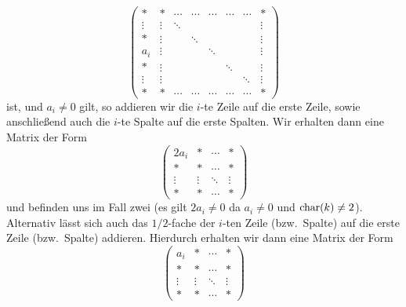 \begin{enumerate}
\[\begin{pmatrix}
        *       & *       & \cdots  & \cdots  & \cdots  & \cdots  & \cdots  & *       \\
        \vdots  & \vdots  & \ddots  &         &         &         &         & \vdots  \\
        *       & \vdots  &         & \ddots  &         &         &         & \vdots  \\
        a_i     & \vdots  &         &         & \ddots  &         &         & \vdots  \\
        *       & \vdots  &         &         &         & \ddots  &         & \vdots  \\
        \vdots  & \vdots  &         &         &         &         & \ddots  & \vdots  \\
        *       & *       & \cdots  & \cdots  & \cdots  & \cdots  & \cdots  & *
      \end{pmatrix}
    \]
    ist, und $a_i \neq 0$ gilt, so addieren wir die $i$-te Zeile auf die erste Zeile, sowie anschließend auch die $i$-te Spalte auf die erste Spalten.
    Wir erhalten dann eine Matrix der Form
    \[
      \begin{pmatrix}
        2a_i    & *       & \cdots  & *       \\
        *       & *       & \cdots  & *       \\
        \vdots  & \vdots  & \ddots  & \vdots  \\
        *       & *       & \cdots  & *
      \end{pmatrix}
    \]
    und befinden uns im Fall zwei (es gilt $2 a_i \neq 0$ da $a_i \neq 0$ und $\operatorname{char}(k) \neq 2$).
    Alternativ lässt sich auch das $1/2$-fache der $i$-ten Zeile (bzw.\ Spalte) auf die erste Zeile (bzw.\ Spalte) addieren.
    Hierdurch erhalten wir dann eine Matrix der Form
    \[
      \begin{pmatrix}
        a_i     & *       & \cdots  & *       \\
        *       & *       & \cdots  & *       \\
        \vdots  & \vdots  & \ddots  & \vdots  \\
        *       & *       & \cdots  & *
      \end{pmatrix}
    \]
\end{enumerate}


\addtocounter{subsection}{-2}
\subsection{}

